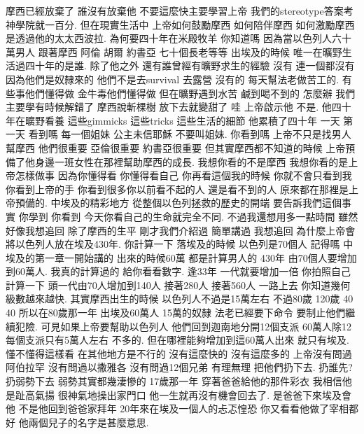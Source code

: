 \documentclass{book}
\begin{document}
摩西已經放棄了 誰沒有放棄他 不要這麼快主要學習上帝 我們的stereotype答案考神學院就一百分.
但在現實生活中 上帝如何鼓勵摩西 如何陪伴摩西 如何激勵摩西 是透過他的太太西波拉.
為何要四十年在米殿牧羊 你知道嗎 因為當以色列人六十萬男人 跟著摩西 阿倫 胡爾 約書亞 七十個長老等等 出埃及的時候 唯一在曠野生活過四十年的是誰.
除了他之外 還有誰曾經有曠野求生的經驗 沒有 連一個都沒有 因為他們是奴隸來的 他們不是去survival 去露營 沒有的 每天幫法老做苦工的.
有些事他們懂得做 金牛毒他們懂得做 但在曠野遇到水苦 鹹到喝不到的 怎麼辦 我們主要學有時候解錯了 摩西說斬棵樹 放下去就變甜了 哇 上帝啟示他 不是.
他四十年在曠野看養 這些gimmicks 這些tricks 這些生活的細節 他累積了四十年 一天 第一天 看到嗎 每一個姐妹 公主未信耶穌 不要叫姐妹.
你看到嗎 上帝不只是找男人幫摩西 他們很重要 亞倫很重要 約書亞很重要 但其實摩西都不知道的時候 上帝預備了他身邊一班女性在那裡幫助摩西的成長.
我想你看的不是摩西 我想你看的是上帝怎樣做事 因為你懂得看 你懂得看自己 你再看這個我的時候 你就不會只看到我 你看到上帝的手 你看到很多你以前看不起的人 還是看不到的人 原來都在那裡是上帝預備的.
中埃及的精彩地方 從整個以色列拯救的歷史的開端 要告訴我們這個事實 你學到 你看到 今天你看自己的生命就完全不同.
不過我還想用多一點時間 雖然好像我想追回 除了摩西的生平 剛才我們介紹過 簡單講過 我想追回 為什麼上帝會將以色列人放在埃及430年.
你計算一下 落埃及的時候 以色列是70個人 記得嗎 中埃及的第一章一開始講的 出來的時候60萬 都是計算男人的 430年 由70個人要增加到60萬人.
我真的計算過的 給你看看數字.
逢33年 一代就要增加一倍 你拍照自己計算一下 頭一代由70人增加到140人 接著280人 接著560人 一路上去 你知道幾何級數越來越快.
其實摩西出生的時候 以色列人不過是15萬左右 不過80歲 120歲 40 40 所以在80歲那一年 出埃及60萬人 15萬的奴隸 法老已經要下命令 要制止他們繼續犯險.
可見如果上帝要幫助以色列人 他們回到迦南地分開12個支派 60萬人除12 每個支派只有5萬人左右 不多的.
但在哪裡能夠增加到這60萬人出來 就只有埃及.
懂不懂得這樣看 在其他地方是不行的 沒有這麼快的 沒有這麼多的 上帝沒有問過阿伯拉罕 沒有問過以撒雅各 沒有問過12個兄弟 有理無理 把他們扔下去.
扔誰先? 扔弱勢下去 弱勢其實都幾淒慘的 17歲那一年 穿著爸爸給他的那件彩衣 我相信他是趾高氣揚 很神氣地操出家門口 他一生就再沒有機會回去了.
是爸爸下來埃及會他 不是他回到爸爸家拜年 20年來在埃及一個人的忐忑惶恐 你又看看他做了宰相都好 他兩個兒子的名字是甚麼意思.
\end{document}
